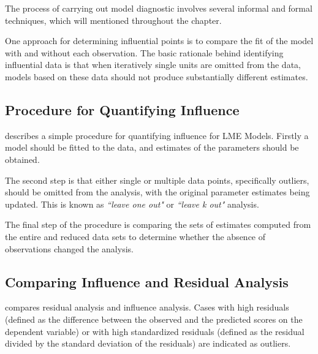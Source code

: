 \documentclass[12pt, a4paper]{report}
\theoremstyle{definition}
\theoremstyle{remark}
\begin{document}
The process of carrying out model diagnostic involves several informal and formal techniques, which will mentioned throughout the chapter.




One approach for determining influential points is to compare the fit of the model with and without each observation. The basic rationale behind identifying influential data is that when iteratively single units are omitted from the data, models based on these data should not produce substantially different estimates. 


\subsection*{Procedure for Quantifying Influence}






\citet{schabenberger} describes a simple procedure for quantifying influence for LME Models. Firstly a model should be fitted to the data, and estimates of the parameters should be obtained. 

The second step is that either single or multiple data points, specifically outliers, should be omitted from the analysis, with the original parameter estimates being updated. This is known as \textit{``leave one out"} or \textit{``leave k out"} analysis. 

The final step of the procedure is comparing the sets of estimates computed from the entire and reduced data sets to determine whether the absence of observations changed the analysis. 



\subsection{Comparing Influence and Residual Analysis}

\citet{influenceLME4} compares residual analysis and influence analysis. Cases with high residuals (defined as the difference between the observed and the predicted scores on the dependent
variable) or with high standardized residuals (defined as the residual divided by the standard deviation
of the residuals) are indicated as outliers.
\end{document}
